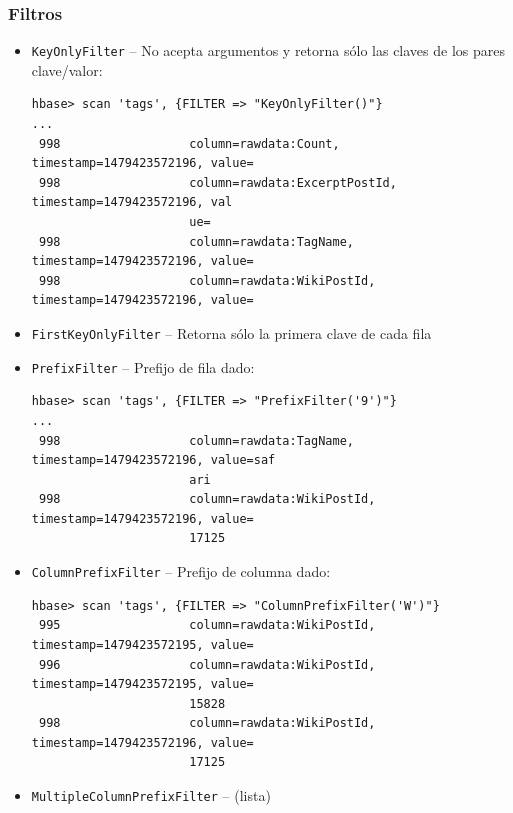 \documentclass[14pt]{beamer}
\begin{document}
\begin{frame}
  \frametitle{Filtros}

  \begin{itemize}
  \item {\tt KeyOnlyFilter} -- No acepta argumentos y retorna sólo las
    claves de los pares clave/valor:

\lstset{basicstyle=\tiny\tt}

\begin{lstlisting}
hbase> scan 'tags', {FILTER => "KeyOnlyFilter()"}
...
 998                  column=rawdata:Count, timestamp=1479423572196, value=
 998                  column=rawdata:ExcerptPostId, timestamp=1479423572196, val
                      ue=
 998                  column=rawdata:TagName, timestamp=1479423572196, value=
 998                  column=rawdata:WikiPostId, timestamp=1479423572196, value=
\end{lstlisting}

\item {\tt FirstKeyOnlyFilter} -- Retorna sólo la primera clave de cada
  fila

  \framebreak

  \item {\tt PrefixFilter} -- Prefijo de fila dado:

    \begin{lstlisting}
hbase> scan 'tags', {FILTER => "PrefixFilter('9')"}
...
 998                  column=rawdata:TagName, timestamp=1479423572196, value=saf
                      ari
 998                  column=rawdata:WikiPostId, timestamp=1479423572196, value=
                      17125
\end{lstlisting}

  \item {\tt ColumnPrefixFilter} -- Prefijo de columna dado:

\begin{lstlisting}
hbase> scan 'tags', {FILTER => "ColumnPrefixFilter('W')"}
 995                  column=rawdata:WikiPostId, timestamp=1479423572195, value=
 996                  column=rawdata:WikiPostId, timestamp=1479423572195, value=
                      15828
 998                  column=rawdata:WikiPostId, timestamp=1479423572196, value=
                      17125
\end{lstlisting}

    \framebreak

\item {\tt MultipleColumnPrefixFilter} -- (lista)


\end{itemize}
\end{frame}
\end{document}
